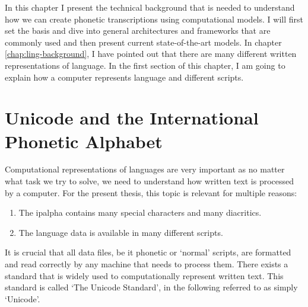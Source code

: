 \label{chap:tech-background}
In this chapter I present the technical background that is needed to understand how we can create phonetic transcriptions using computational models. I will first set the basis and dive into general architectures and frameworks that are commonly used and then present current state-of-the-art models. In chapter \ref{chap:ling-background}, I have pointed out that there are many different written representations of language. In the first section of this chapter, I am going to explain how a computer represents language and different scripts. 


\section{Unicode and the International Phonetic Alphabet}
\label{sec:unicode_ipa}
Computational representations of languages are very important as no matter what task we try to solve, we need to understand how written text is processed by a computer. For the present thesis, this topic is relevant for multiple reasons: 
\begin{enumerate}
\item The \ac{ipalpha} contains many special characters and many diacritics.
\item The language data is available in many different scripts.
\end{enumerate} 

It is crucial that all data files, be it phonetic or `normal' scripts, are formatted and read correctly by any machine that needs to process them. There exists a standard that is widely used to computationally represent written text. This standard is called `The Unicode Standard', in the following referred to as simply `Unicode'. 

